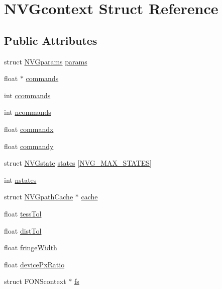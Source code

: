 \hypertarget{struct_n_v_gcontext}{\section{N\+V\+Gcontext Struct Reference}
\label{struct_n_v_gcontext}
}
\subsection*{Public Attributes}
\begin{DoxyCompactItemize}
\item 
struct \hyperlink{struct_n_v_gparams}{N\+V\+Gparams} \hyperlink{struct_n_v_gcontext_a230a0fedbf975917517794b684b940ac}{params}
\item 
float $\ast$ \hyperlink{struct_n_v_gcontext_a24bc3804b6b64c955e7318835f033f31}{commands}
\item 
int \hyperlink{struct_n_v_gcontext_abdd400974a0e442333120fb98d5e49e7}{ccommands}
\item 
int \hyperlink{struct_n_v_gcontext_af3583d9602e9ea415b01c2692392a02a}{ncommands}
\item 
float \hyperlink{struct_n_v_gcontext_abe9bb2cd4ee241f6bf9d1dc5ca1b2d5c}{commandx}
\item 
float \hyperlink{struct_n_v_gcontext_a93da42b3cceca9295f2d61bd6291aba5}{commandy}
\item 
struct \hyperlink{struct_n_v_gstate}{N\+V\+Gstate} \hyperlink{struct_n_v_gcontext_a8912216e631b9f2106c386003d22daa3}{states} \mbox{[}\hyperlink{nanovg_8cpp_a978a4acce811fad2b353d6c226b516aa}{N\+V\+G\+\_\+\+M\+A\+X\+\_\+\+S\+T\+A\+T\+E\+S}\mbox{]}
\item 
int \hyperlink{struct_n_v_gcontext_ac38f94f78cc3eeed7c8c1cb033e5b7ab}{nstates}
\item 
struct \hyperlink{struct_n_v_gpath_cache}{N\+V\+Gpath\+Cache} $\ast$ \hyperlink{struct_n_v_gcontext_aaac08d9a828908e7ec66c7ebed1b5c08}{cache}
\item 
float \hyperlink{struct_n_v_gcontext_a12879e67beadb4dfd5dbd43aa8b87de9}{tess\+Tol}
\item 
float \hyperlink{struct_n_v_gcontext_a211c3cdfeb97271da5fda042a136b2d4}{dist\+Tol}
\item 
float \hyperlink{struct_n_v_gcontext_a3302fa98005c6cb433b79afc87ae6cab}{fringe\+Width}
\item 
float \hyperlink{struct_n_v_gcontext_ac0f07cffd892243e5a9e312378177404}{device\+Px\+Ratio}
\item 
struct F\+O\+N\+Scontext $\ast$ \hyperlink{struct_n_v_gcontext_ac871fe2ad80359e19231aafeebff0289}{fs}

\end{DoxyCompactItemize}
